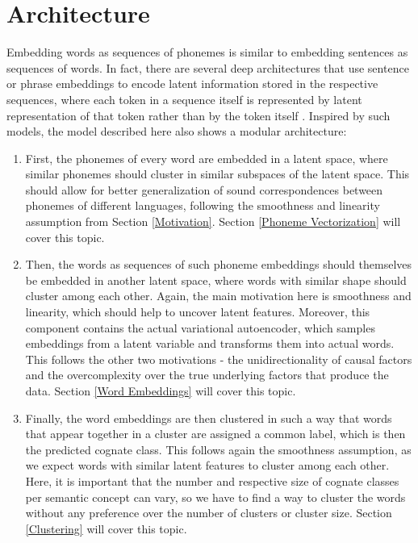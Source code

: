 \documentclass[6pt]{article}
\begin{document}
\section{Architecture}
\label{Architecture}
Embedding words as sequences of phonemes is similar to embedding sentences as sequences of words. In fact, there are several deep architectures that use sentence or phrase embeddings to encode latent information stored in the respective sequences, where each token in a sequence itself is represented by latent representation of that token rather than by the token itself \citep{kiros2015skip,zhang2014bilingually}.
Inspired by such models, the model described here also shows a modular architecture:
\begin{enumerate}
\item First, the phonemes of every word are embedded in a latent space, where similar phonemes should cluster in similar subspaces of the latent space. This should allow for better generalization of sound correspondences between phonemes of different languages, following the smoothness and linearity assumption from Section \ref{Motivation}. Section \ref{Phoneme Vectorization} will cover this topic.
\item Then, the words as sequences of such phoneme embeddings should themselves be embedded in another latent space, where words with similar shape should cluster among each other.  Again, the main motivation here is smoothness and linearity, which should help to uncover latent features. Moreover, this component contains the actual variational autoencoder, which samples embeddings from a latent variable and transforms them into actual words. This follows the other two motivations - the unidirectionality of causal factors and the overcomplexity over the true underlying factors that produce the data. Section \ref{Word Embeddings} will cover this topic.
\item Finally, the word embeddings are then clustered in such a way that words that appear together in a cluster are assigned a common label, which is then the predicted cognate class.  This follows again the smoothness assumption, as we expect words with similar latent features to cluster among each other. Here, it is important that the number and respective size of cognate classes per semantic concept can vary, so we have to find a way to cluster the words without any preference over the number of clusters or cluster size. Section \ref{Clustering} will cover this topic.
\end{enumerate}
\end{document}
